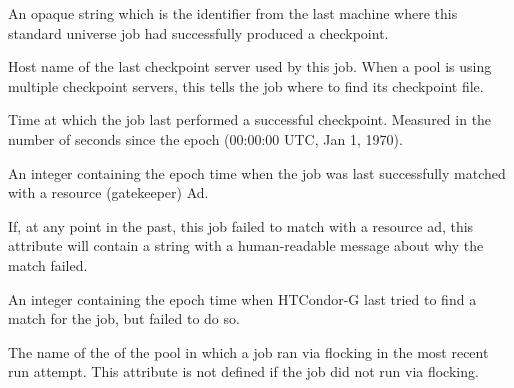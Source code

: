 \begin{description}
\item[\AdAttr{LastCheckpointPlatform}:]  An opaque string which is the
 identifier from the last machine where this
standard universe job had successfully produced a checkpoint.

\item[\AdAttr{LastCkptServer}:]  Host name of the last checkpoint
server used by this job.  When a pool is using multiple checkpoint
servers, this tells the job where to find its checkpoint file.

\item[\AdAttr{LastCkptTime}:]  Time at which the job last performed a
successful checkpoint.  Measured in the number of seconds since the
epoch (00:00:00 UTC, Jan 1, 1970).

\item[\AdAttr{LastMatchTime}:]  An integer containing the epoch time
when the job was last successfully matched with a resource (gatekeeper) Ad.

\item[\AdAttr{LastRejMatchReason}:]   If, at any point in the past,
this job failed to match with a resource ad,
this attribute will contain a string with a
human-readable message about why the match failed.

\item[\AdAttr{LastRejMatchTime}:]   An integer containing the epoch
time when HTCondor-G last tried to find a match for the job,
but failed to do so.

\item[\AdAttr{LastRemotePool}:]  The name of the  of the pool
in which a job ran via flocking in the most recent run attempt.  
This attribute is not defined if the job did not run via flocking.


\end{description}

